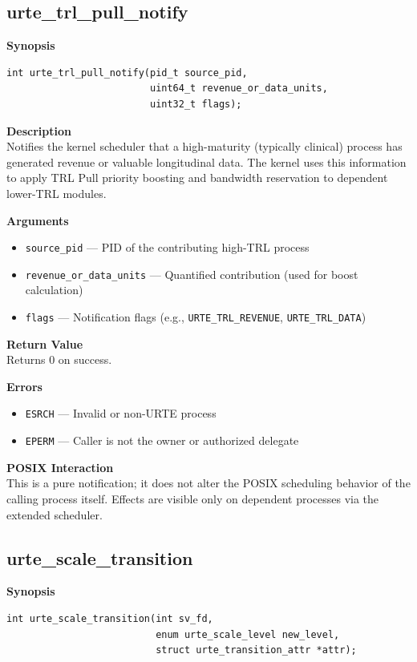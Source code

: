 \documentclass[11pt,a4paper]{report}
\begin{document}
\subsection{urte\_trl\_pull\_notify}

\textbf{Synopsis}
\begin{verbatim}
int urte_trl_pull_notify(pid_t source_pid,
                         uint64_t revenue_or_data_units,
                         uint32_t flags);
\end{verbatim}

\textbf{Description}\\
Notifies the kernel scheduler that a high-maturity (typically clinical) process has generated revenue or valuable longitudinal data. The kernel uses this information to apply TRL Pull priority boosting and bandwidth reservation to dependent lower-TRL modules.

\textbf{Arguments}
\begin{itemize}
    \item \texttt{source\_pid} — PID of the contributing high-TRL process
    \item \texttt{revenue\_or\_data\_units} — Quantified contribution (used for boost calculation)
    \item \texttt{flags} — Notification flags (e.g., \texttt{URTE\_TRL\_REVENUE}, \texttt{URTE\_TRL\_DATA})
\end{itemize}

\textbf{Return Value}\\
Returns 0 on success.

\textbf{Errors}
\begin{itemize}
    \item \texttt{ESRCH} — Invalid or non-URTE process
    \item \texttt{EPERM} — Caller is not the owner or authorized delegate
\end{itemize}

\textbf{POSIX Interaction}\\
This is a pure notification; it does not alter the POSIX scheduling behavior of the calling process itself. Effects are visible only on dependent processes via the extended scheduler.

\subsection{urte\_scale\_transition}

\textbf{Synopsis}
\begin{verbatim}
int urte_scale_transition(int sv_fd,
                          enum urte_scale_level new_level,
                          struct urte_transition_attr *attr);
\end{verbatim}
\end{document}
